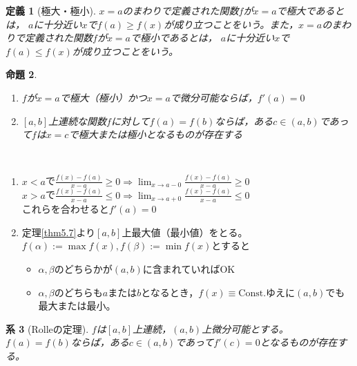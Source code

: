 \documentclass[dvipdfmx,a4j,10pt]{jsarticle}
\makeatletter
\theoremstyle{mystyle1}
\newtheorem{dfn}{定義}[part]
\newtheorem{cor}[dfn]{系}
\newtheorem{prop}[dfn]{命題}
\theoremstyle{mystyle2}
\renewenvironment{proof}[1][\proofname]{\par
  \pushQED{\qed}%
  \normalfont
  \topsep6\p@\@plus6\p@ \trivlist
  \item[\hskip\labelsep{\bfseries\sffamily #1}]\ignorespaces
}{%
  \popQED\endtrivlist\@endpefalse
}
\renewcommand\proofname{証明}
\makeatother
\begin{document}
\begin{framed}
    \begin{dfn}[極大・極小]\label{def6.3}
        $x=a$のまわりで定義された関数$f$が$x=a$で極大であるとは， $a$に十分近い\footnotemark $x$で$f(a)\geq f(x)$が成り立つことをいう。また，$x=a$のまわりで定義された関数$f$が$x=a$で極小であるとは， $a$に十分近い$x$で$f(a)\leq f(x)$が成り立つことをいう。
    \end{dfn}
\end{framed}

\begin{framed}
    \begin{prop}\label{prop6.4}　
    \begin{enumerate}
        \item $f$が$x=a$で極大（極小）かつ$x=a$で微分可能ならば，$f'(a)=0$
        \item $[a,b]$上連続な関数$f$に対して$f(a)=f(b)$ならば，ある$c\in (a,b)$であって$f$は$x=c$で極大または極小となるものが存在する
    \end{enumerate}
    \end{prop}
\end{framed}

\begin{proof}[命題\ref{prop6.4}の証明]\
    \begin{enumerate}
        \item
        $x<a$で$\displaystyle \frac{f(x)-f(a)}{x-a}\geq 0\Rightarrow \lim_{x\to a-0}\frac{f(x)-f(a)}{x-a}\geq 0$\\
        $x>a$で$\displaystyle \frac{f(x)-f(a)}{x-a}\leq 0\Rightarrow \lim_{x\to a+0}\frac{f(x)-f(a)}{x-a}\leq 0$\\
        これらを合わせると$f'(a)=0$
        \item
        定理\ref{thm5.7}より$[a,b]$上最大値（最小値）をとる。$f(\alpha):=\max f(x),f(\beta):=\min f(x)$とすると
        \begin{itemize}
            \item $\alpha,\beta$のどちらかが$(a,b)$に含まれていればOK
            \item $\alpha,\beta$のどちらも$a$または$b$となるとき，$f(x)\equiv \textrm{Const.}$ゆえに$(a,b)$でも最大または最小。
        \end{itemize}
    \end{enumerate}
\end{proof}

\newpage

\begin{framed}
    \begin{cor}[Rolleの定理]\label{cor6.5}
        $f$は$[a,b]$上連続，$(a,b)$上微分可能とする。$f(a)=f(b)$ならば，ある$c\in (a,b)$であって$f'(c)=0$となるものが存在する。
    \end{cor}
\end{framed}
\end{document}
